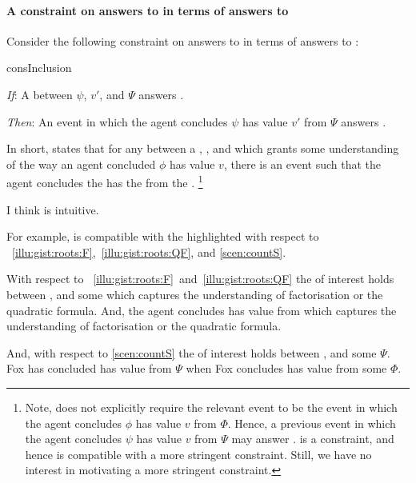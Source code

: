 \paragraph*{A constraint on answers to \qWhy{} in terms of answers to \qHow{}}


\begin{note}
  Consider the following constraint on answers to \qWhy{} in terms of answers to \qHow{}:

  \begin{constraint}{consInclusion}{\issueInclusion{}}
    \mbox{ }
    \vspace{-\baselineskip}
    \begin{itenum}
    \item[\emph{If}:]
      A \ros{} between \(\psi\), \(v'\), and \(\Psi\) answers \qWhy{}.
    \item[\emph{Then}:]
      An event in which the agent concludes \(\psi\) has value \(v'\) from \(\Psi\) answers \qHow{}.
    \end{itenum}
    \vspace{-\baselineskip}
  \end{constraint}

  \noindent%
  In short, \issueInclusion{} states that for any \ros{} between a , , and \pool{} which grants some understanding of the way an agent concluded \(\phi\) has value \(v\), there is an event such that the agent concludes the \prop{} has the \val{} from the \pool{}.%
  \footnote{
    Note, \qHow{} does not explicitly require the relevant event to be the event in which the agent concludes \(\phi\) has value \(v\) from \(\Phi\).
    Hence, a previous event in which the agent concludes \(\psi\) has value \(v\) from \(\Psi\) may answer \qHow{}.
    \issueInclusion{} is a constraint, and hence is compatible with a more stringent constraint.
    Still, we have no interest in motivating a more stringent constraint.
  }

  I think \issueInclusion{} is intuitive.

  For example, \issueInclusion{} is compatible with the  highlighted with respect to ~\ref{illu:gist:roots:F},~\ref{illu:gist:roots:QF}, and \autoref{scen:countS}.

  With respect to ~\ref{illu:gist:roots:F}~and~\ref{illu:gist:roots:QF} the \ros{} of interest holds between \propM{\rootsCon{}},  and some \pool{} which captures the \agents{} understanding of factorisation or the quadratic formula.
  And, the agent concludes \propM{\rootsCon{}} has value  from \pool{} which captures the \agents{} understanding of factorisation or the quadratic formula.

  And, with respect to \autoref{scen:countS} the \ros{} of interest holds between ,  and some \pool{} \(\Psi\).
  Fox has concluded  has value  from \(\Psi\) when Fox concludes  has value  from some \pool{} \(\Phi\).
\end{note}


